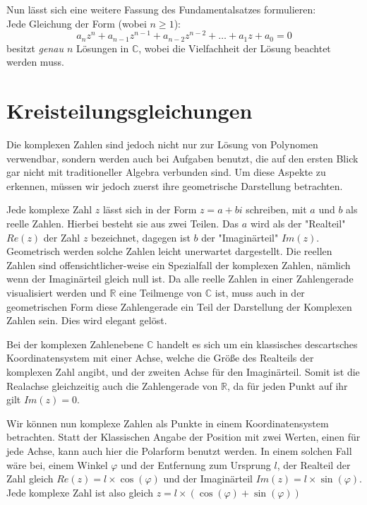 \documentclass[a4paper,12pt]{article} %
\begin{document}
\noindent Nun lässt sich eine weitere Fassung des Fundamentalsatzes formulieren:\\

\noindent Jede Gleichung der Form (wobei $n \geq 1$):
\begin{equation}\label{eq:funda2}
	\boxed{	a_nz^n + a_{n-1}z^{n-1} + a_{n-2}z^{n-2} + \dots + a_1z + a_0 = 0
	}
\end{equation}
besitzt \emph{genau $n$} Lösungen in $\mathbb{C}$, wobei die Vielfachheit der Lösung beachtet werden muss.


\section{Kreisteilungsgleichungen}

Die komplexen Zahlen sind jedoch nicht nur zur Lösung von Polynomen verwendbar, sondern werden auch bei Aufgaben benutzt, die auf den ersten Blick gar nicht mit traditioneller Algebra verbunden sind.
Um diese Aspekte zu erkennen, müssen wir jedoch zuerst ihre geometrische Darstellung betrachten.

Jede komplexe Zahl $z$ lässt sich in der Form $z=a+bi$ schreiben, mit $a$ und $b$ als reelle Zahlen.
Hierbei besteht sie aus zwei Teilen.
Das $a$ wird als der "Realteil" $Re(z)$ der Zahl $z$ bezeichnet, dagegen ist $b$ der "{Imaginärteil}" $Im(z)$.
Geometrisch werden solche Zahlen leicht unerwartet dargestellt. Die reellen Zahlen sind offensichtlicher-weise ein Spezialfall der komplexen Zahlen, nämlich wenn der Imaginärteil gleich null ist.
Da alle reelle Zahlen in einer Zahlengerade visualisiert werden und $\mathbb{R}$ eine Teilmenge von $\mathbb{C}$ ist, muss auch in der geometrischen Form diese Zahlengerade ein Teil der Darstellung der Komplexen Zahlen sein.
Dies wird elegant gelöst.

Bei der komplexen Zahlenebene $\mathbb{C}$ handelt es sich um ein klassisches descartsches Koordinatensystem mit einer Achse, welche die Größe des Realteils der komplexen Zahl angibt, und der zweiten Achse für den Imaginärteil. Somit ist die Realachse gleichzeitig auch die Zahlengerade von $\mathbb{R}$, da für jeden Punkt auf ihr gilt $Im(z)=0$.

Wir können nun komplexe Zahlen als Punkte in einem Koordinatensystem betrachten.
Statt der Klassischen Angabe der Position mit zwei Werten, einen für jede Achse, kann auch hier die Polarform benutzt werden.
In einem solchen Fall wäre bei, einem Winkel $\varphi$ und der Entfernung zum Ursprung $l$, der Realteil der Zahl gleich $Re(z)=l\times\cos(\varphi)$ und der Imaginärteil $Im(z)=l\times\sin(\varphi)$.
Jede komplexe Zahl ist also gleich $z=l\times(\cos(\varphi)+\sin(\varphi))$
\end{document}

